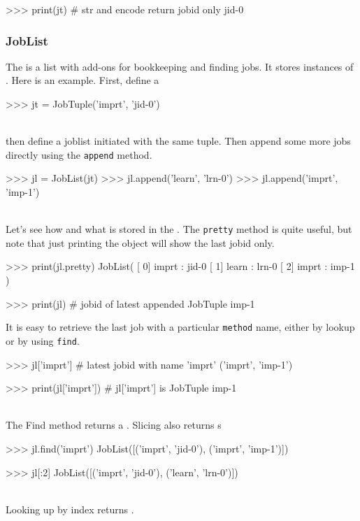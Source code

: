 \begin{pythonEND}
>>> print(jt)  # str and encode return jobid only
jid-0
\end{pythonEND}



\subsubsection{JobList}

\label{sec:joblist}
The \joblist is a list with add-ons for bookkeeping and finding jobs.
It stores instances of \jobtuple.  Here is an example.  First, define
a \jobtuple

\begin{pythonBEG}
>>> jt = JobTuple('imprt', 'jid-0')
\end{pythonBEG}
\\
then define a joblist initiated with the same tuple.  Then append some
more jobs directly using the \texttt{append} method.

\begin{pythonMID}
>>> jl = JobList(jt)
>>> jl.append('learn', 'lrn-0')
>>> jl.append('imprt', 'imp-1')
\end{pythonMID}
\\
Let's see how and what is stored in the \joblist.  The \texttt{pretty}
method is quite useful, but note that just printing the object will
show the last jobid only.

\begin{pythonMID}
>>> print(jl.pretty)
JobList(
   [  0]  imprt : jid-0
   [  1]  learn : lrn-0
   [  2]  imprt : imp-1
)

>>>  print(jl)  # jobid of latest appended JobTuple
imp-1
\end{pythonMID}

It is easy to retrieve the last job with a particular \texttt{method}
name, either by lookup or by using \texttt{find}.

\begin{pythonMID}
>>> jl['imprt']         # latest jobid with name 'imprt'
('imprt', 'imp-1')

>>> print(jl['imprt'])   # jl['imprt'] is JobTuple
imp-1
\end{pythonMID}
\\
The Find method returns a \joblist.  Slicing also returns {\joblist}s

\begin{pythonMID}
>>> jl.find('imprt')
JobList([('imprt', 'jid-0'), ('imprt', 'imp-1')])

>>> jl[:2]
JobList([('imprt', 'jid-0'), ('learn', 'lrn-0')])
\end{pythonMID}
\\
Looking up by index returns \jobtuple.

